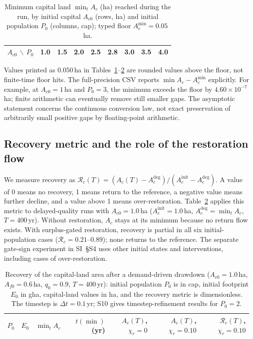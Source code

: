 \documentclass[11pt,a4paper]{article}
\newcommand{\Acmin}{A_c^{\min}}
\begin{document}
\begin{table}[htbp]
\centering\small
\caption{Minimum capital land $\min_tA_c$ (ha) reached during the run, by initial capital $A_{c0}$ (rows, ha) and initial population $P_0$ (columns, cap); typed floor $\Acmin=0.05$\,ha.}
\label{tab:si_drawdown}
\begin{tabular}{lrrrrrrrr}
\toprule
$A_{c0}$ $\backslash$ $P_0$ & 1.0 & 1.5 & 2.0 & 2.5 & 2.8 & 3.0 & 3.5 & 4.0 \\
\midrule


\end{tabular}
\end{table}

\noindent Values printed as $0.050$\,ha in Tables~\ref{tab:si_drawdown}--\ref{tab:si_recovery} are rounded values above the floor, not finite-time floor hits. The full-precision CSV reports $\min A_c-\Acmin$ explicitly. For example, at $A_{c0}=1$\,ha and $P_0=3$, the minimum exceeds the floor by $4.60\times10^{-7}$\,ha; finite arithmetic can eventually remove still smaller gaps. The asymptotic statement concerns the continuous conversion law, not exact preservation of arbitrarily small positive gaps by floating-point arithmetic.

\subsection{Recovery metric and the role of the restoration flow}\label{si:recovery}

We measure recovery as $\mathcal R_c(T)=(A_c(T)-A_c^{\mathrm{deg}})/(A_c^{\mathrm{init}}-A_c^{\mathrm{deg}})$. A value of 0 means no recovery, 1 means return to the reference, a negative value means further decline, and a value above 1 means over-restoration. Table~\ref{tab:si_recovery} applies this metric to delayed-quality runs with $A_{c0}=1.0$\,ha ($A_c^{\mathrm{init}}=1.0$\,ha, $A_c^{\mathrm{deg}}=\min_tA_c$, $T=400$\,yr). Without restoration, $A_c$ stays at its minimum because no return flow exists. With surplus-gated restoration, recovery is partial in all six initial-population cases ($\mathcal R_c=0.21$--$0.89$); none returns to the reference. The separate gate-sign experiment in SI~\S S4 uses other initial states and interventions, including cases of over-restoration.

\begin{table}[htbp]
\centering\small
\caption{Recovery of the capital-land area after a demand-driven drawdown ($A_{c0}=1.0$\,ha, $A_{f0}=0.6$\,ha, $q_0=0.9$, $T=400$\,yr): initial population $P_0$ is in cap, initial footprint $E_0$ in gha, capital-land values in ha, and the recovery metric is dimensionless. The timestep is $\Delta t=0.1$\,yr; S10 gives timestep-refinement results for $P_0=2$.}
\label{tab:si_recovery}
\begin{tabular}{l r r r r r r}
\toprule
$P_0$ & $E_0$ & $\min_tA_c$ & $t(\min)$ (yr) & $A_c(T)$, $\chi_r=0$ & $A_c(T)$, $\chi_r=0.10$ & $\mathcal R_c(T)$, $\chi_r=0.10$ \\
\midrule


\end{tabular}
\end{table}
\end{document}
